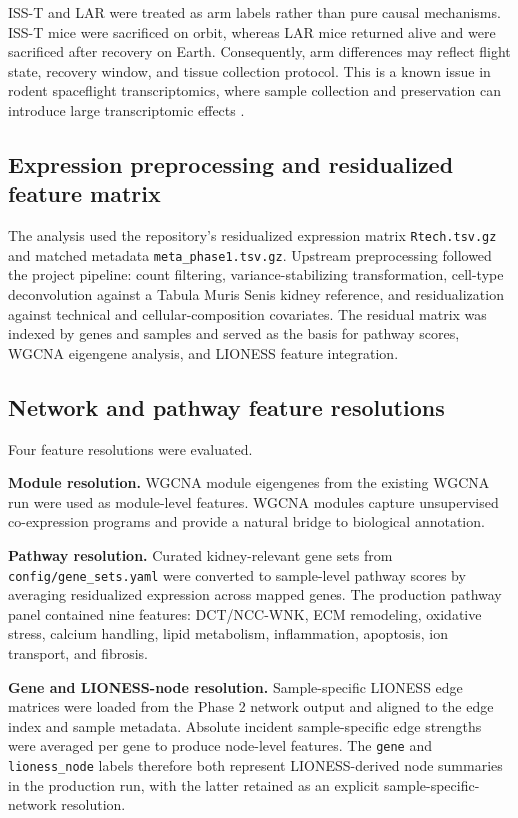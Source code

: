 \documentclass[11pt]{article}
\newcommand{\code}[1]{\texttt{#1}}
\begin{document}
ISS-T and LAR were treated as arm labels rather than pure causal mechanisms. ISS-T mice were sacrificed on orbit, whereas LAR mice returned alive and were sacrificed after recovery on Earth. Consequently, arm differences may reflect flight state, recovery window, and tissue collection protocol. This is a known issue in rodent spaceflight transcriptomics, where sample collection and preservation can introduce large transcriptomic effects \citep{galazka2020rnaseq}.

\subsection{Expression preprocessing and residualized feature matrix}

The analysis used the repository's residualized expression matrix \code{Rtech.tsv.gz} and matched metadata \code{meta\_phase1.tsv.gz}. Upstream preprocessing followed the project pipeline: count filtering, variance-stabilizing transformation, cell-type deconvolution against a Tabula Muris Senis kidney reference, and residualization against technical and cellular-composition covariates. The residual matrix was indexed by genes and samples and served as the basis for pathway scores, WGCNA eigengene analysis, and LIONESS feature integration.

\subsection{Network and pathway feature resolutions}

Four feature resolutions were evaluated.

\textbf{Module resolution.} WGCNA module eigengenes from the existing WGCNA run were used as module-level features. WGCNA modules capture unsupervised co-expression programs and provide a natural bridge to biological annotation.

\textbf{Pathway resolution.} Curated kidney-relevant gene sets from \code{config/gene\_sets.yaml} were converted to sample-level pathway scores by averaging residualized expression across mapped genes. The production pathway panel contained nine features: DCT/NCC-WNK, ECM remodeling, oxidative stress, calcium handling, lipid metabolism, inflammation, apoptosis, ion transport, and fibrosis.

\textbf{Gene and LIONESS-node resolution.} Sample-specific LIONESS edge matrices were loaded from the Phase 2 network output and aligned to the edge index and sample metadata. Absolute incident sample-specific edge strengths were averaged per gene to produce node-level features. The \code{gene} and \code{lioness\_node} labels therefore both represent LIONESS-derived node summaries in the production run, with the latter retained as an explicit sample-specific-network resolution.
\end{document}
